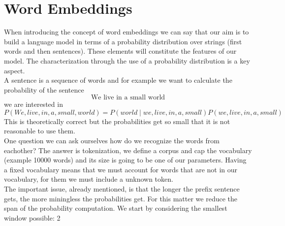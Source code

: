 \section{Word Embeddings}
 When introducing the concept of word embeddings we can say that our aim is to build a language model in terms of a probability distribution over strings (first words and then sentences). These elements will constitute the features of our model. The characterization through the use of a probability distribution is a key aspect.\\
 A sentence is a sequence of words and for example we want to calculate the probability of the sentence
 \[ 
    \text{We live in a small world} 
 \]
 we are interested in
 \[ 
    P(We, live, in, a, small, world) = P(world \mid we, live, in , a, small) P(we, live, in , a ,small) 
 \]This is theoretically correct but the probabilities get so small that it is not reasonable to use them.\\
 One question we can ask ourselves how do we recognize the words from eachother? The answer is tokenization, we define a corpus and cap the vocabulary (example 10000 words) and its size is going to be one of our parameters. Having a fixed vocabulary means that we must account for words that are not in our vocabulary, for them we must include a unknown token.\\The important issue, already mentioned, is that the longer the prefix sentence gets, the more miningless the probabilities get. For this matter we reduce the span of the probability computation. We start by considering the smallest window possible: 2
